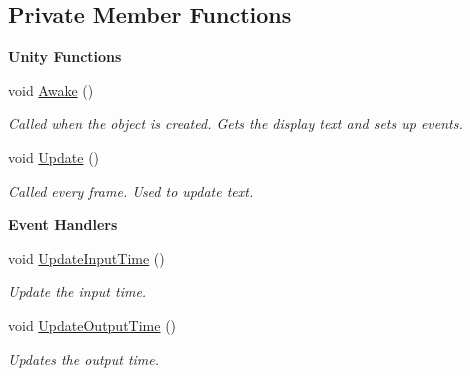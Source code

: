 \subsection*{Private Member Functions}
\begin{Indent}\textbf{ Unity Functions}\par
\begin{DoxyCompactItemize}
\item 
\mbox{\label{class_a_t_i___diagnostics_a41cd250c9f5eea98dec6f32f49aa727f}} 
void \hyperlink{class_a_t_i___diagnostics_a41cd250c9f5eea98dec6f32f49aa727f}{Awake} ()
\begin{DoxyCompactList}\small\item\em Called when the object is created. Gets the display text and sets up events. \end{DoxyCompactList}\item 
\mbox{\label{class_a_t_i___diagnostics_a4d131588b33317383ff7430b2917658e}} 
void \hyperlink{class_a_t_i___diagnostics_a4d131588b33317383ff7430b2917658e}{Update} ()
\begin{DoxyCompactList}\small\item\em Called every frame. Used to update text. \end{DoxyCompactList}\end{DoxyCompactItemize}
\end{Indent}
\begin{Indent}\textbf{ Event Handlers}\par
\begin{DoxyCompactItemize}
\item 
\mbox{\label{class_a_t_i___diagnostics_afcdfad4dc61b1f22a6efcef738897515}} 
void \hyperlink{class_a_t_i___diagnostics_afcdfad4dc61b1f22a6efcef738897515}{Update\+Input\+Time} ()
\begin{DoxyCompactList}\small\item\em Update the input time. \end{DoxyCompactList}\item 
\mbox{\label{class_a_t_i___diagnostics_ac172cf129d078d8b0e979bc17d11c5a0}} 
void \hyperlink{class_a_t_i___diagnostics_ac172cf129d078d8b0e979bc17d11c5a0}{Update\+Output\+Time} ()
\begin{DoxyCompactList}\small\item\em Updates the output time. \end{DoxyCompactList}\end{DoxyCompactItemize}
\end{Indent}
